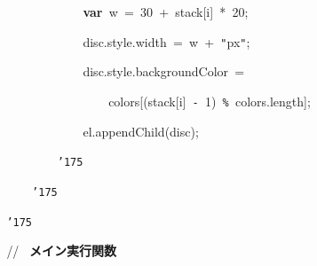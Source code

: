 \documentclass[a4paper,10pt]{article}
\def\mc{\relax}
\begin{document}
\noindent
\mbox{}{\tt\mc \ }{\tt\mc \ }{\tt\mc \ }{\tt\mc \ }{\tt\mc \ }{\tt\mc \ }{\tt\mc \ }{\tt\mc \ }{\tt\mc \ }{\tt\mc \ }{\tt\mc \ }{\tt\mc \ }{\tt\mc \ }{\tt\mc \ }{\tt\mc \ }{\tt\mc \ }{\tt\mc \ }{\tt\mc \ }{\tt\mc \ }{\tt\mc \ }\textbf{var}{\tt\mc \ }w{\tt\mc \ }={\tt\mc \ }30{\tt\mc \ }+{\tt\mc \ }stack[i]{\tt\mc \ }*{\tt\mc \ }20;

\noindent
\mbox{}{\tt\mc \ }{\tt\mc \ }{\tt\mc \ }{\tt\mc \ }{\tt\mc \ }{\tt\mc \ }{\tt\mc \ }{\tt\mc \ }{\tt\mc \ }{\tt\mc \ }{\tt\mc \ }{\tt\mc \ }{\tt\mc \ }{\tt\mc \ }{\tt\mc \ }{\tt\mc \ }{\tt\mc \ }{\tt\mc \ }{\tt\mc \ }{\tt\mc \ }disc.style.width{\tt\mc \ }={\tt\mc \ }w{\tt\mc \ }+{\tt\mc \ }{\tt "}px{\tt "};

\noindent
\mbox{}{\tt\mc \ }{\tt\mc \ }{\tt\mc \ }{\tt\mc \ }{\tt\mc \ }{\tt\mc \ }{\tt\mc \ }{\tt\mc \ }{\tt\mc \ }{\tt\mc \ }{\tt\mc \ }{\tt\mc \ }{\tt\mc \ }{\tt\mc \ }{\tt\mc \ }{\tt\mc \ }{\tt\mc \ }{\tt\mc \ }{\tt\mc \ }{\tt\mc \ }disc.style.backgroundColor{\tt\mc \ }=

\noindent
\mbox{}{\tt\mc \ }{\tt\mc \ }{\tt\mc \ }{\tt\mc \ }{\tt\mc \ }{\tt\mc \ }{\tt\mc \ }{\tt\mc \ }{\tt\mc \ }{\tt\mc \ }{\tt\mc \ }{\tt\mc \ }{\tt\mc \ }{\tt\mc \ }{\tt\mc \ }{\tt\mc \ }{\tt\mc \ }{\tt\mc \ }{\tt\mc \ }{\tt\mc \ }{\tt\mc \ }{\tt\mc \ }{\tt\mc \ }{\tt\mc \ }colors[(stack[i]{\tt\mc \ }{\tt -}{\tt\mc \ }1){\tt\mc \ }{\tt\%}{\tt\mc \ }colors.length];

\noindent
\mbox{}{\tt\mc \ }{\tt\mc \ }{\tt\mc \ }{\tt\mc \ }{\tt\mc \ }{\tt\mc \ }{\tt\mc \ }{\tt\mc \ }{\tt\mc \ }{\tt\mc \ }{\tt\mc \ }{\tt\mc \ }{\tt\mc \ }{\tt\mc \ }{\tt\mc \ }{\tt\mc \ }{\tt\mc \ }{\tt\mc \ }{\tt\mc \ }{\tt\mc \ }el.appendChild(disc);

\noindent
\mbox{}{\tt\mc \ }{\tt\mc \ }{\tt\mc \ }{\tt\mc \ }{\tt\mc \ }{\tt\mc \ }{\tt\mc \ }{\tt\mc \ }{\tt\mc \ }{\tt\mc \ }{\tt\mc \ }{\tt\mc \ }{\tt\mc \ }{\tt\mc \ }{\tt\mc \ }{\tt\mc \ }{\tt\char'175}

\noindent
\mbox{}{\tt\mc \ }{\tt\mc \ }{\tt\mc \ }{\tt\mc \ }{\tt\mc \ }{\tt\mc \ }{\tt\mc \ }{\tt\mc \ }{\tt\mc \ }{\tt\mc \ }{\tt\mc \ }{\tt\mc \ }{\tt\char'175}

\noindent
\mbox{}{\tt\mc \ }{\tt\mc \ }{\tt\mc \ }{\tt\mc \ }{\tt\mc \ }{\tt\mc \ }{\tt\mc \ }{\tt\mc \ }{\tt\char'175}

\noindent
\mbox{}\hfill

\noindent
\mbox{}{\tt\mc \ }{\tt\mc \ }{\tt\mc \ }{\tt\mc \ }{\tt\mc \ }{\tt\mc \ }{\tt\mc \ }{\tt\mc \ }\rm\mc // \ {\bf メイン実行関数} \hfill
\tt\mc 
\end{document}
